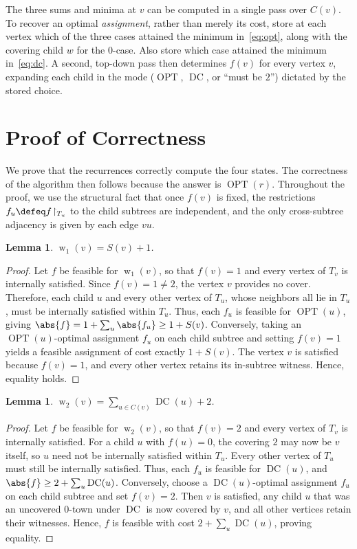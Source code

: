 \documentclass[11pt, a4paper]{article}
\newcommand{\OPT}{\operatorname{OPT}}
\newcommand{\DC}{\operatorname{DC}}
\newcommand{\with}[1]{\operatorname{w}_{#1}}  %
\newcommand{\Tv}{T_{v}}
\theoremstyle{plain}
\newtheorem{lemma}[theorem]{Lemma}
\theoremstyle{definition}
\begin{document}
\noindent The three sums and minima at $v$ can be computed in a single pass over
$C(v)$. To recover an optimal \emph{assignment}, rather than merely its cost,
store at each vertex which of the three cases attained the minimum
in~\eqref{eq:opt}, along with the covering child $w$ for the $0$-case. Also store
which case attained the minimum in~\eqref{eq:dc}. A second, top-down pass then
determines $f(v)$ for every vertex $v$, expanding each child in the mode
($\OPT$, $\DC$, or ``must be $2$'') dictated by the stored choice.

\section{Proof of Correctness}

We prove that the recurrences correctly compute the four states. The correctness
of the algorithm then follows because the answer is $\OPT(r)$. Throughout the
proof, we use the structural fact that once $f(v)$ is fixed, the restrictions
$f_u \defeq f\!\restriction_{T_u}$ to the child subtrees are independent, and the
only cross-subtree adjacency is given by each edge $vu$.

\begin{lemma}\label{lem:w1}
$\with{1}(v) = S(v) + 1$.
\end{lemma}
\begin{proof}
Let $f$ be feasible for $\with{1}(v)$, so that $f(v) = 1$ and every vertex of
$\Tv$ is internally satisfied. Since $f(v) = 1 \neq 2$, the vertex $v$ provides no
cover. Therefore, each child $u$ and every other vertex of $T_u$, whose neighbors
all lie in $T_u$, must be internally satisfied within $T_u$. Thus, each $f_u$ is
feasible for $\OPT(u)$, giving $\abs{f} = 1 + \sum_u \abs{f_u} \ge 1 + S(v)$.
Conversely, taking an $\OPT(u)$-optimal assignment $f_u$ on each child subtree and
setting $f(v) = 1$ yields a feasible assignment of cost exactly $1 + S(v)$. The
vertex $v$ is satisfied because $f(v) = 1$, and every other vertex retains its
in-subtree witness. Hence, equality holds.
\end{proof}

\begin{lemma}\label{lem:w2}
$\with{2}(v) = \sum_{u \in C(v)} \DC(u) + 2$.
\end{lemma}
\begin{proof}
Let $f$ be feasible for $\with{2}(v)$, so that $f(v) = 2$ and every vertex of
$\Tv$ is internally satisfied. For a child $u$ with $f(u) = 0$, the covering $2$
may now be $v$ itself, so $u$ need not be internally satisfied within $T_u$. Every
other vertex of $T_u$ must still be internally satisfied. Thus, each $f_u$ is
feasible for $\DC(u)$, and $\abs{f} \ge 2 + \sum_u \DC(u)$. Conversely, choose a
$\DC(u)$-optimal assignment $f_u$ on each child subtree and set $f(v) = 2$. Then
$v$ is satisfied, any child $u$ that was an uncovered $0$-town under $\DC$ is now
covered by $v$, and all other vertices retain their witnesses. Hence, $f$ is
feasible with cost $2 + \sum_u \DC(u)$, proving equality.
\end{proof}
\end{document}
